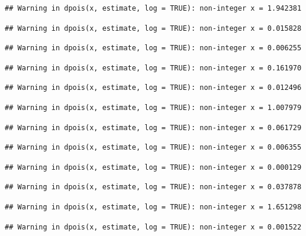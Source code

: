 \documentclass[]{article}
\begin{document}
\begin{verbatim}
## Warning in dpois(x, estimate, log = TRUE): non-integer x = 1.942381
\end{verbatim}

\begin{verbatim}
## Warning in dpois(x, estimate, log = TRUE): non-integer x = 0.015828
\end{verbatim}

\begin{verbatim}
## Warning in dpois(x, estimate, log = TRUE): non-integer x = 0.006255
\end{verbatim}

\begin{verbatim}
## Warning in dpois(x, estimate, log = TRUE): non-integer x = 0.161970
\end{verbatim}

\begin{verbatim}
## Warning in dpois(x, estimate, log = TRUE): non-integer x = 0.012496
\end{verbatim}

\begin{verbatim}
## Warning in dpois(x, estimate, log = TRUE): non-integer x = 1.007979
\end{verbatim}

\begin{verbatim}
## Warning in dpois(x, estimate, log = TRUE): non-integer x = 0.061729
\end{verbatim}

\begin{verbatim}
## Warning in dpois(x, estimate, log = TRUE): non-integer x = 0.006355
\end{verbatim}

\begin{verbatim}
## Warning in dpois(x, estimate, log = TRUE): non-integer x = 0.000129
\end{verbatim}

\begin{verbatim}
## Warning in dpois(x, estimate, log = TRUE): non-integer x = 0.037878
\end{verbatim}

\begin{verbatim}
## Warning in dpois(x, estimate, log = TRUE): non-integer x = 1.651298
\end{verbatim}

\begin{verbatim}
## Warning in dpois(x, estimate, log = TRUE): non-integer x = 0.001522
\end{verbatim}
\end{document}
